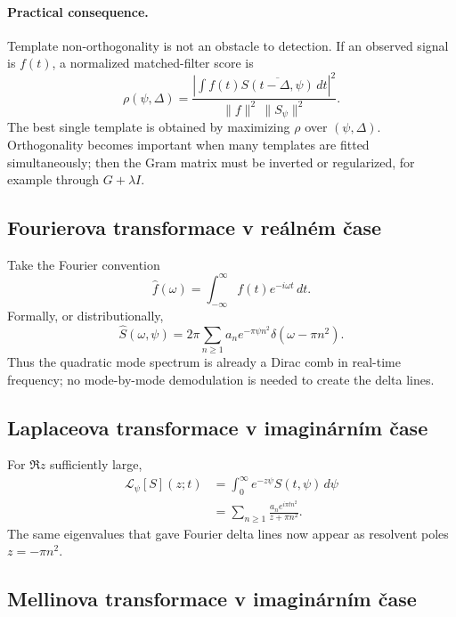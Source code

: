 \paragraph{Practical consequence.}
Template non-orthogonality is not an obstacle to detection.  If an observed signal is
$f(t)$, a normalized matched-filter score is
\begin{equation}
  \rho(\psi,\Delta)
  =\frac{\left|\int f(t)\overline{S(t-\Delta,\psi)}\,dt\right|^2}
  {\|f\|^2\,\|S_\psi\|^2}.
  \label{eq:theta-matched-filter}
\end{equation}
The best single template is obtained by maximizing $\rho$ over $(\psi,\Delta)$.
Orthogonality becomes important when many templates are fitted simultaneously; then the
Gram matrix must be inverted or regularized, for example through $G+\lambda I$.

\subsection{Fourierova transformace v reálném čase}

Take the Fourier convention
\begin{equation}
  \widehat f(\omega)=\int_{-\infty}^{\infty}f(t)e^{-i\omega t}\,dt.
\end{equation}
Formally, or distributionally,
\begin{equation}
  \widehat S(\omega,\psi)
  =2\pi\sum_{n\ge1}a_n e^{-\pi\psi n^2}
       \delta(\omega-\pi n^2).
  \label{eq:fourier-delta-spectrum}
\end{equation}
Thus the quadratic mode spectrum is already a Dirac comb in real-time frequency; no
mode-by-mode demodulation is needed to create the delta lines.

\subsection{Laplaceova transformace v imaginárním čase}

For $\Re z$ sufficiently large,
\begin{align}
  \mathcal L_\psi[S](z;t)
   &=\int_0^\infty e^{-z\psi}S(t,\psi)\,d\psi \\
   &=\sum_{n\ge1}
      \frac{a_n e^{i\pi t n^2}}{z+\pi n^2}.
  \label{eq:laplace-resolvent}
\end{align}
The same eigenvalues that gave Fourier delta lines now appear as resolvent poles
$z=-\pi n^2$.

\subsection{Mellinova transformace v imaginárním čase}

